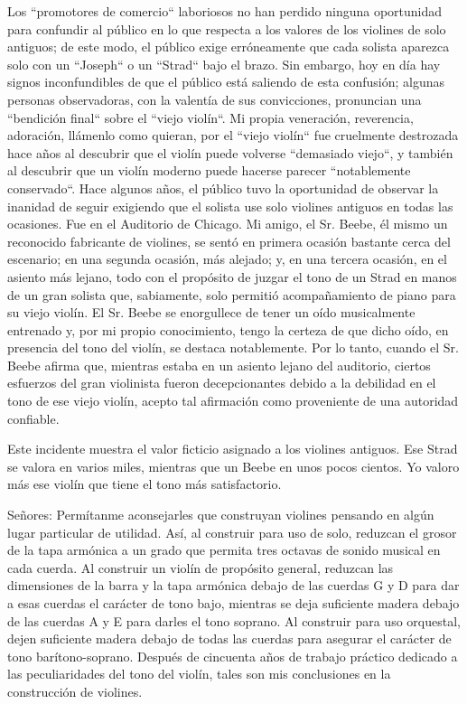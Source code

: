 \documentclass[12pt]{book}
\begin{document}
Los ``promotores de comercio`` laboriosos no han perdido ninguna oportunidad para confundir al público en lo que respecta a los valores de los violines de solo antiguos; de este modo, el público exige erróneamente que cada solista aparezca solo con un ``Joseph`` o un ``Strad`` bajo el brazo. Sin embargo, hoy en día hay signos inconfundibles de que el público está saliendo de esta confusión; algunas personas observadoras, con la valentía de sus convicciones, pronuncian una ``bendición final`` sobre el ``viejo violín``. Mi propia veneración, reverencia, adoración, llámenlo como quieran, por el ``viejo violín`` fue cruelmente destrozada hace años al descubrir que el violín puede volverse ``demasiado viejo``, y también al descubrir que un violín moderno puede hacerse parecer ``notablemente conservado``. Hace algunos años, el público tuvo la oportunidad de observar la inanidad de seguir exigiendo que el solista use solo violines antiguos en todas las ocasiones. Fue en el Auditorio de Chicago. Mi amigo, el Sr. Beebe, él mismo un reconocido fabricante de violines, se sentó en primera ocasión bastante cerca del escenario; en una segunda ocasión, más alejado; y, en una tercera ocasión, en el asiento más lejano, todo con el propósito de juzgar el tono de un Strad en manos de un gran solista que, sabiamente, solo permitió acompañamiento de piano para su viejo violín. El Sr. Beebe se enorgullece de tener un oído musicalmente entrenado y, por mi propio conocimiento, tengo la certeza de que dicho oído, en presencia del tono del violín, se destaca notablemente. Por lo tanto, cuando el Sr. Beebe afirma que, mientras estaba en un asiento lejano del auditorio, ciertos esfuerzos del gran violinista fueron decepcionantes debido a la debilidad en el tono de ese viejo violín, acepto tal afirmación como proveniente de una autoridad confiable.

Este incidente muestra el valor ficticio asignado a los violines antiguos. Ese Strad se valora en varios miles, mientras que un Beebe en unos pocos cientos. Yo valoro más ese violín que tiene el tono más satisfactorio.

Señores: Permítanme aconsejarles que construyan violines pensando en algún lugar particular de utilidad.
Así, al construir para uso de solo, reduzcan el grosor de la tapa armónica a un grado que permita tres octavas de sonido musical en cada cuerda. Al construir un violín de propósito general, reduzcan las dimensiones de la barra y la tapa armónica debajo de las cuerdas G y D para dar a esas cuerdas el carácter de tono bajo, mientras se deja suficiente madera debajo de las cuerdas A y E para darles el tono soprano. Al construir para uso orquestal, dejen suficiente madera debajo de todas las cuerdas para asegurar el carácter de tono barítono-soprano. Después de cincuenta años de trabajo práctico dedicado a las peculiaridades del tono del violín, tales son mis conclusiones en la construcción de violines.
\end{document}
